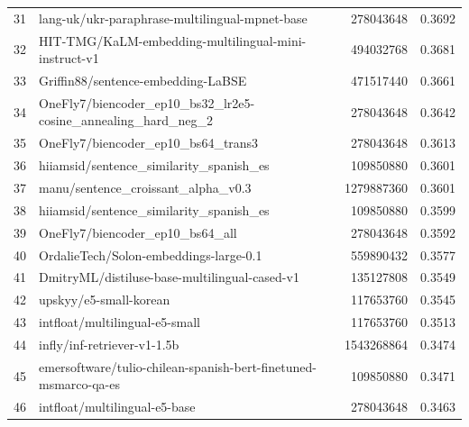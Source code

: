 {\begin{xltabular}{\textwidth}{l X rc}
    31               & lang-uk/ukr-paraphrase-multilingual-mpnet-base                             & 278043648     & 0.3692       \\
    32               & HIT-TMG/KaLM-embedding-multilingual-mini-instruct-v1                       & 494032768     & 0.3681       \\
    33               & Griffin88/sentence-embedding-LaBSE                                         & 471517440     & 0.3661       \\
    34               & OneFly7/biencoder\_ep10\_bs32\_lr2e5-cosine\_annealing\_hard\_neg\_2      & 278043648     & 0.3642       \\
    35               & OneFly7/biencoder\_ep10\_bs64\_trans3                                      & 278043648     & 0.3613       \\
    36               & hiiamsid/sentence\_similarity\_spanish\_es                                 & 109850880     & 0.3601       \\
    37               & manu/sentence\_croissant\_alpha\_v0.3                                      & 1279887360    & 0.3601       \\
    38               & hiiamsid/sentence\_similarity\_spanish\_es                                 & 109850880     & 0.3599       \\
    39               & OneFly7/biencoder\_ep10\_bs64\_all                                         & 278043648     & 0.3592       \\
    40               & OrdalieTech/Solon-embeddings-large-0.1                                     & 559890432     & 0.3577       \\
    41               & DmitryML/distiluse-base-multilingual-cased-v1                              & 135127808     & 0.3549       \\
    42               & upskyy/e5-small-korean                                                     & 117653760     & 0.3545       \\
    43               & intfloat/multilingual-e5-small                                             & 117653760     & 0.3513       \\
    44               & infly/inf-retriever-v1-1.5b                                                & 1543268864    & 0.3474       \\
    45               & emersoftware/tulio-chilean-spanish-bert-finetuned-msmarco-qa-es            & 109850880     & 0.3471       \\
    46               & intfloat/multilingual-e5-base                                              & 278043648     & 0.3463       \\

\end{xltabular}}
